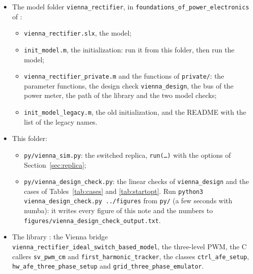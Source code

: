 \documentclass[11pt,a4paper]{scrartcl}
\newcommand{\code}[1]{\texttt{#1}}
\newcommand{\us}{\_\allowbreak}  %
\begin{document}
\begin{onehalfspace}
\begin{itemize}
	\item The model folder \code{vienna\us rectifier}, in \code{foundations\us of\us power\us electronics} of \cite{model_repo}:
	\begin{itemize}[nosep]
		\item \code{vienna\_rectifier.slx}, the model;
		\item \code{init\_model.m}, the initialization: run it from this folder, then run the model;
		\item \code{vienna\_rectifier\_private.m} and the functions of \code{private/}: the parameter functions, the design check \code{vienna\_design}, the bus of the power meter, the path of the library and the two model checks;
		\item \code{init\_model\_legacy.m}, the old initialization, and the README with the list of the legacy names.
	\end{itemize}
	\item This folder:
	\begin{itemize}[nosep]
		\item \code{py/vienna\_sim.py}: the switched replica, \code{run(\ldots)} with the options of Section~\ref{sec:replica};
		\item \code{py/vienna\_design\_check.py}: the linear checks of \code{vienna\_design} and the cases of Tables~\ref{tab:cases} and \ref{tab:startopt}. Run \code{python3 vienna\_design\_check.py ../figures} from \code{py/} (a few seconds with numba): it writes every figure of this note and the numbers to \code{figures/\allowbreak vienna\us design\us check\us output.txt}.
	\end{itemize}
	\item The library \cite{library_repo}: the Vienna bridge \code{vienna\us rectifier\us ideal\us switch\us based\us model}, the three-level PWM, the C callers \code{sv\_pwm\_cm} and \code{first\us harmonic\us tracker}, the classes \code{ctrl\_afe\_setup}, \code{hw\us afe\us three\us phase\us setup} and \code{grid\us three\us phase\us emulator}.
\end{itemize}


\end{onehalfspace}
\end{document}
